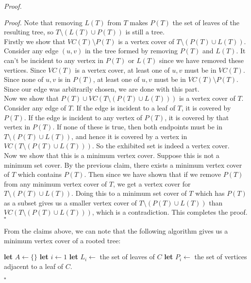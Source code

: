 \documentclass[a4paper]{article}
\newenvironment{proof}{\begin{breakbox}\textit{Proof.}}{\hfill$\square$\end{breakbox}}
\newcommand{\nl}{\vspace{0.2cm}\\}
\begin{document}
\begin{proof}
\begin{proof}
        Note that removing $L(T)$ from $T$ makes $P(T)$ the set of leaves of the resulting tree, so $T \setminus (L(T) \cup P(T))$ is still a tree.\nl
        Firstly we show that $VC(T) \setminus P(T)$ is a vertex cover of $T \setminus (P(T) \cup L(T))$. Consider any edge $(u, v)$ in the tree formed by removing $P(T)$ and $L(T)$. It can't be
        incident to any vertex in $P(T)$ or $L(T)$ since we have removed these vertices. Since $VC(T)$ is a vertex cover, at least one of $u, v$ must be in $VC(T)$. Since none of $u, v$ is
        in $P(T)$, at least one of $u, v$ must be in $VC(T) \setminus P(T)$. Since our edge was arbitrarily chosen, we are done with this part.\nl
        Now we show that $P(T) \cup VC(T \setminus (P(T) \cup L(T)))$ is a vertex cover of $T$. Consider any edge of $T$. If the edge is incident to a leaf of $T$, it is covered by $P(T)$. If
        the edge is incident to any vertex of $P(T)$, it is covered by that vertex in $P(T)$. If none of these is true, then both endpoints must be in $T \setminus (P(T) \cup L(T))$, and hence
        it is covered by a vertex in $VC(T \setminus (P(T) \cup L(T)))$. So the exhibited set is indeed a vertex cover.\nl
        Now we show that this is a minimum vertex cover. Suppose this is not a minimum set cover. By the previous claim, there exists a minimum vertex cover of $T$ which contains $P(T)$. Then
        since we have shown that if we remove $P(T)$ from any minimum vertex cover of $T$, we get a vertex cover for $T \setminus (P(T) \cup L(T))$. Doing this to a minimum set cover of $T$ which
        has $P(T)$ as a subset gives us a smaller vertex cover of $T \setminus (P(T) \cup L(T))$ than $VC(T \setminus (P(T) \cup L(T)))$, which is a contradiction. This completes the proof.
    \end{proof}
    From the claims above, we can note that the following algorithm gives us
    a minimum vertex cover of a rooted tree:
    \begin{algorithmic}[1]
            \State \textbf{let} $A \gets \{\}$
            \State \textbf{let} $i \gets 1$
                \State \textbf{let} $L_i \gets$ the set of leaves of $C$
                \State \textbf{let} $P_i \gets$ the set of vertices adjacent to a leaf of $C$.

\end{algorithmic}
\end{proof}
\end{document}
